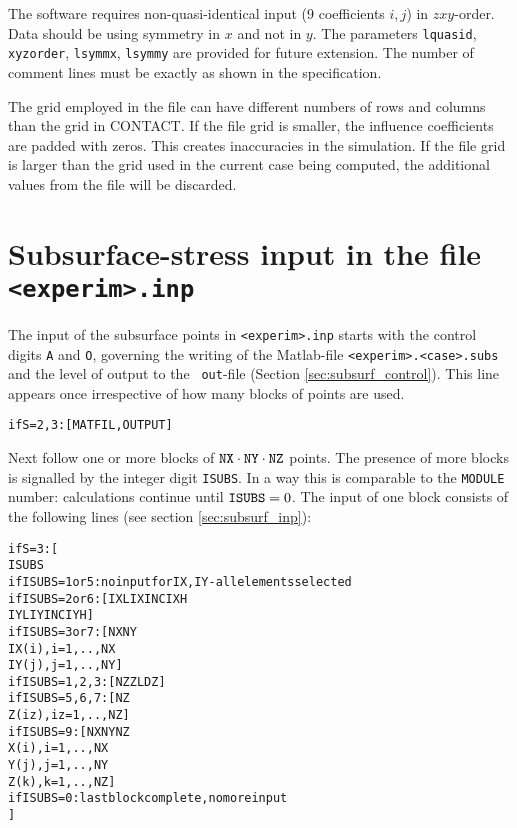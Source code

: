 \documentclass[12pt]{report}
\begin{document}
The software requires non-quasi-identical input (9 coefficients $i,j$) in
$zxy$-order. Data should be using symmetry in $x$ and not in $y$. The
parameters {\tt lquasid}, {\tt xyzorder}, {\tt lsymmx}, {\tt lsymmy} are
provided for future extension.
The number of comment lines must be exactly as shown in the specification.

The grid employed in the file can have different numbers of rows and
columns than the grid in CONTACT. If the file grid is smaller, the
influence coefficients are padded with zeros. This creates inaccuracies in
the simulation. If the file grid is larger than the grid used in the
current case being computed, the additional values from the file will be
discarded.

\section{Subsurface-stress input in the file {\tt <experim>.inp}}
\label{sec:spec_subsinp}

The input of the subsurface points in {\tt <experim>.inp} starts with the
control digits {\tt A} and {\tt O}, governing the writing of the
Matlab-file {\tt <experim>.<case>.subs} and the level of output to the {\tt
out}-file (Section \ref{sec:subsurf_control}). This line appears once
irrespective of how many blocks of points are used.
\begin{alltt}\small
    if S=2,3: [ MATFIL, OUTPUT ]
\end{alltt}
Next follow one or more blocks of ${\tt NX}\cdot{\tt NY}\cdot{\tt NZ}$
points. The presence of more blocks is signalled by the integer
digit {\tt ISUBS}. In a way this is comparable to the {\tt MODULE} number:
calculations continue until ${\tt ISUBS}=0$. The input of one block
consists of the following lines (see section \ref{sec:subsurf_inp}):
\begin{alltt}\small
    if S=3: [ 
       ISUBS
       if ISUBS=1 or 5:   no input for IX,IY - all elements selected
       if ISUBS=2 or 6: [ IXL IXINC IXH  
                          IYL IYINC IYH      ]
       if ISUBS=3 or 7: [ NX  NY
                          IX(i), i=1,..,NX
                          IY(j), j=1,..,NY   ]
       if ISUBS=1,2,3:  [ NZ  ZL  DZ         ]
       if ISUBS=5,6,7:  [ NZ
                          Z(iz), iz=1,..,NZ  ]
       if ISUBS=9:      [ NX  NY  NZ
                          X(i),  i=1,..,NX
                          Y(j),  j=1,..,NY
                          Z(k),  k=1,..,NZ   ]
       if ISUBS=0:      last block complete, no more input
    ]
\end{alltt}
\end{document}
